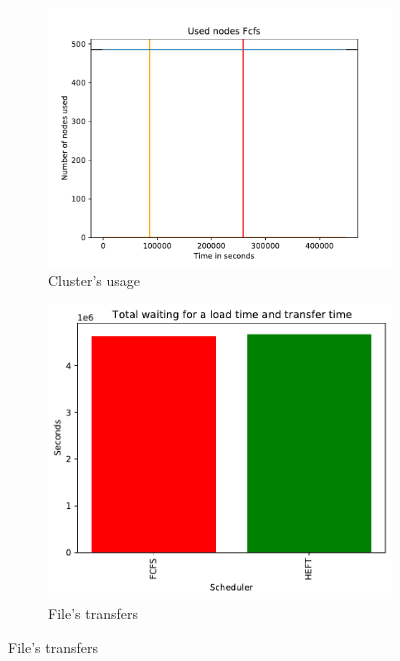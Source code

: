 \documentclass[a4paper]{article}
\begin{document}
\begin{figure}[H]\centering
\begin{subfigure}[b]{0.4\linewidth}\centering\includegraphics[width=1\linewidth]{MBSS/plot/2022-06-12->2022-06-13_V9271_Fcfs_Used_nodes_450_128_32_256_4_1024.pdf}\caption{Cluster's usage}\end{subfigure}
\begin{subfigure}[b]{0.4\linewidth}\centering\includegraphics[width=0.9\linewidth]{MBSS/plot/Results_FCFS_Score_Adaptative_Multiplier_2022-06-12->2022-06-13_V9271_Total_waiting_for_a_load_time_and_transfer_time_450_128_32_256_4_1024.pdf}\caption{File's transfers}\end{subfigure}

\end{figure}
\end{document}
